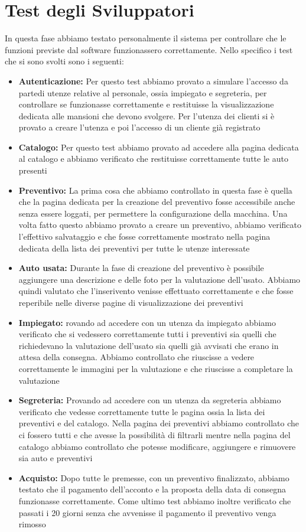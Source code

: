 \documentclass[a4paper, 11pt,oneside]{book}
\begin{document}
    \section{Test degli Sviluppatori}
        In questa fase abbiamo testato personalmente il sistema per controllare che le funzioni previste dal software funzionassero correttamente. Nello specifico i test che si sono svolti sono i seguenti:
        \begin{itemize}
            \item \textbf{Autenticazione:} Per questo test abbiamo provato a simulare l'accesso da partedi utenze relative al personale, ossia impiegato e segreteria, per controllare se funzionasse correttamente e restituisse la visualizzazione dedicata alle mansioni che devono svolgere. Per l’utenza dei clienti si è provato a creare l’utenza e poi l'accesso di un cliente già registrato
            \item \textbf{Catalogo:} Per questo test abbiamo provato ad accedere alla pagina dedicata al catalogo e abbiamo verificato che restituisse correttamente tutte le auto presenti
            \item \textbf{Preventivo:} La prima cosa che abbiamo controllato in questa fase è quella che la pagina dedicata per la creazione del preventivo fosse accessibile anche senza essere loggati, per permettere la configurazione della macchina. Una volta fatto questo abbiamo provato a creare un preventivo, abbiamo verificato l'effettivo salvataggio e che fosse correttamente mostrato nella pagina dedicata della lista dei preventivi per tutte le utenze interessate
            \item \textbf{Auto usata:} Durante la fase di creazione del preventivo è possibile aggiungere una descrizione e delle foto per la valutazione dell'usato. Abbiamo quindi valutato che l'inserivento venisse effettuato correttamente e che fosse reperibile nelle diverse pagine di visualizzazione dei preventivi
            \item \textbf{Impiegato:} rovando ad accedere con un utenza da impiegato abbiamo verificato che si vedessero correttamente tutti i preventivi sia quelli che richiedevano la valutazione dell’usato sia quelli già avvisati che erano in attesa della consegna. Abbiamo controllato che riuscisse a vedere correttamente le immagini per la valutazione e che riuscisse a completare la valutazione
            \item \textbf{Segreteria:} Provando ad accedere con un utenza da segreteria abbiamo verificato che vedesse correttamente tutte le pagina ossia la lista dei preventivi e del catalogo. Nella pagina dei preventivi abbiamo controllato che ci fossero tutti e che avesse la possibilità di filtrarli mentre
            nella pagina del catalogo abbiamo controllato che potesse modificare, aggiungere e rimuovere sia auto e preventivi
            \item \textbf{Acquisto:} Dopo tutte le premesse, con un preventivo finalizzato, abbiamo testato che il pagamento dell'acconto e la proposta della data di consegna funzionasse correttamente. Come ultimo test abbiamo inoltre verificato che passati i 20 giorni senza che avvenisse il pagamento il preventivo
            venga rimosso
        \end{itemize}
\end{document}
